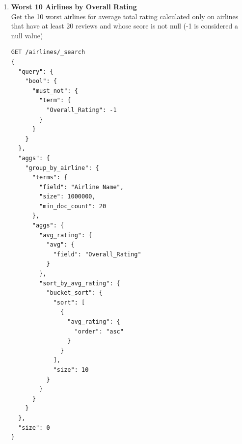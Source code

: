 \documentclass{Configuration_Files/PoliMi3i_thesis}
\begin{document}
\begin{enumerate}
\begin{figure}[H]
\end{figure}

\newpage

    \item \textbf{Worst 10 Airlines by Overall Rating} \\
    Get the 10 worst airlines for average total rating calculated only on airlines that have at least 20 reviews and whose score is not null (-1 is considered a null value)

    \begin{verbatim}
GET /airlines/_search
{
  "query": {
    "bool": {
      "must_not": {
        "term": {
          "Overall_Rating": -1
        }
      }
    }
  },
  "aggs": {
    "group_by_airline": {
      "terms": {
        "field": "Airline Name",
        "size": 1000000, 
        "min_doc_count": 20
      },
      "aggs": {
        "avg_rating": {
          "avg": {
            "field": "Overall_Rating"
          }
        },
        "sort_by_avg_rating": {
          "bucket_sort": {
            "sort": [
              {
                "avg_rating": {
                  "order": "asc"  
                }
              }
            ],
            "size": 10 
          }
        }
      }
    }
  },
  "size": 0
}


\end{verbatim}
\end{enumerate}
\end{document}
